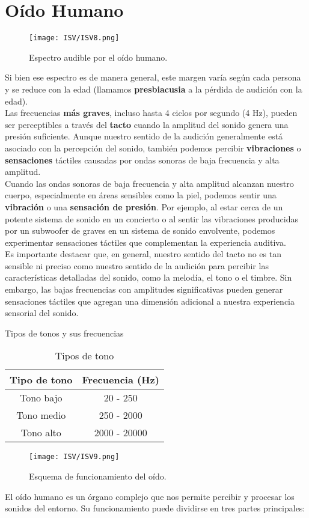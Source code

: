 \documentclass[
	12pt, %
	fleqn, %
	a4paper, %
	oneside, %
]{LegrandOrangeBook}
\begin{document}
\section{Oído Humano}
\begin{figure}[H]
\centering
\texttt{[image: ISV/ISV8.png]}
\caption{Espectro audible por el oído humano.}
\end{figure}
Si bien ese espectro es de manera general, este margen varía según cada persona y se reduce con la edad (llamamos \textbf{presbiacusia} a la pérdida de audición con la edad). \\
Las frecuencias \textbf{más graves}, incluso hasta 4 ciclos por segundo (4 Hz), pueden ser perceptibles a través del \textbf{tacto} cuando la amplitud del sonido genera una presión suficiente. Aunque nuestro sentido de la audición generalmente está asociado con la percepción del sonido, también podemos percibir \textbf{vibraciones} o \textbf{sensaciones} táctiles causadas por ondas sonoras de baja frecuencia y alta amplitud.\\
Cuando las ondas sonoras de baja frecuencia y alta amplitud alcanzan nuestro cuerpo, especialmente en áreas sensibles como la piel, podemos sentir una \textbf{vibración} o una \textbf{sensación de presión}. Por ejemplo, al estar cerca de un potente sistema de sonido en un concierto o al sentir las vibraciones producidas por un subwoofer de graves en un sistema de sonido envolvente, podemos experimentar sensaciones táctiles que complementan la experiencia auditiva.\\
Es importante destacar que, en general, nuestro sentido del tacto no es tan sensible ni preciso como nuestro sentido de la audición para percibir las características detalladas del sonido, como la melodía, el tono o el timbre. Sin embargo, las bajas frecuencias con amplitudes significativas pueden generar sensaciones táctiles que agregan una dimensión adicional a nuestra experiencia sensorial del sonido.
\begin{table}[h]
\centering
\caption{Tipos de tonos y sus frecuencias}
\begin{tabular}{|c|c|}
\hline
\textbf{Tipo de tono} & \textbf{Frecuencia (Hz)} \\
\hline
Tono bajo & 20 - 250 \\
\hline
Tono medio & 250 - 2000 \\
\hline
Tono alto & 2000 - 20000 \\
\hline
\end{tabular}
\caption{Tipos de tono}
\end{table}
\begin{figure}[H]
\centering
\texttt{[image: ISV/ISV9.png]}
\caption{Esquema de funcionamiento del oído.}
\end{figure}
El oído humano es un órgano complejo que nos permite percibir y procesar los sonidos del entorno. Su funcionamiento puede dividirse en tres partes principales:
\end{document}
